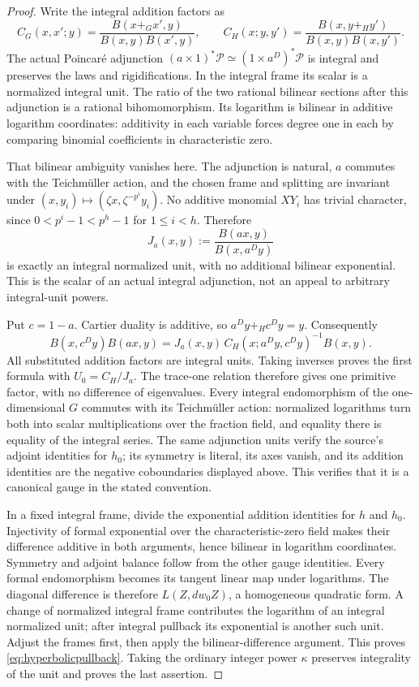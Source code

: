 \documentclass[11pt,a4paper]{article}
\theoremstyle{definition}\newtheorem{remark}[theorem]{Remark}
\begin{document}
\begin{proof}
Write the integral addition factors as
\[
 C_G(x,x';y)=\frac{B(x+_Gx',y)}{B(x,y)B(x',y)},\qquad
 C_H(x;y,y')=\frac{B(x,y+_Hy')}{B(x,y)B(x,y')}.
\]
The actual Poincar\'e adjunction
$(a\times1)^*\mathcal P\simeq(1\times a^D)^*\mathcal P$
is integral and preserves the laws and rigidifications. In the integral frame its scalar is a normalized integral unit.
The ratio of the two rational bilinear sections after this adjunction is a rational bihomomorphism. Its logarithm is bilinear in additive logarithm coordinates: additivity in each variable forces degree one in each by comparing binomial coefficients in characteristic zero.

That bilinear ambiguity vanishes here. The adjunction is natural, $a$ commutes with the Teichm\"uller action, and the chosen frame and splitting are invariant under
$(x,y_i)\mapsto(\zeta x,\zeta^{-p^i}y_i)$.
No additive monomial $XY_i$ has trivial character, since
$0<p^i-1<p^h-1$ for $1\le i<h$.
Therefore
\[
 J_a(x,y):=\frac{B(ax,y)}{B(x,a^Dy)}
\]
is exactly an integral normalized unit, with no additional bilinear exponential.
This is the scalar of an actual integral adjunction, not an appeal to arbitrary integral-unit powers.

Put $c=1-a$. Cartier duality is additive, so
$a^Dy+_Hc^Dy=y$. Consequently
\[
 B(x,c^Dy)B(ax,y)
 =J_a(x,y)\,C_H(x;a^Dy,c^Dy)^{-1}B(x,y).
\]
All substituted addition factors are integral units. Taking inverses proves the first formula with $U_0=C_H/J_a$.
The trace-one relation therefore gives one primitive factor, with no difference of eigenvalues.
Every integral endomorphism of the one-dimensional $G$ commutes with its Teichm\"uller action: normalized logarithms turn both into scalar multiplications over the fraction field, and equality there is equality of the integral series.
The same adjunction units verify the source's adjoint identities for $h_0$; its symmetry is literal, its axes vanish, and its addition identities are the negative coboundaries displayed above. This verifies that it is a canonical gauge in the stated convention.

In a fixed integral frame, divide the exponential addition identities for $h$ and $h_0$. Injectivity of formal exponential over the characteristic-zero field makes their difference additive in both arguments, hence bilinear in logarithm coordinates.
Symmetry and adjoint balance follow from the other gauge identities.
Every formal endomorphism becomes its tangent linear map under logarithms. The diagonal difference is therefore $L(Z,dw_0Z)$, a homogeneous quadratic form.
A change of normalized integral frame contributes the logarithm of an integral normalized unit; after integral pullback its exponential is another such unit. Adjust the frames first, then apply the bilinear-difference argument. This proves \eqref{eq:hyperbolicpullback}. Taking the ordinary integer power $\kappa$ preserves integrality of the unit and proves the last assertion.
\end{proof}
\end{document}
